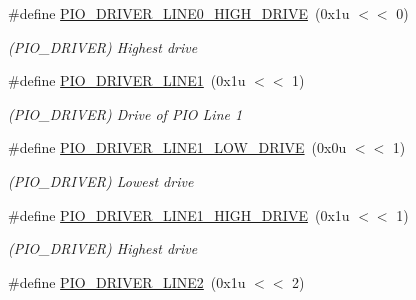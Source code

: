 \begin{DoxyCompactItemize}
\mbox{\label{group__SAME70__PIO_gae18af59abd02442e0dec363f8127e6e8}} 
\#define \mbox{\hyperlink{group__SAME70__PIO_gae18af59abd02442e0dec363f8127e6e8}{P\+I\+O\+\_\+\+D\+R\+I\+V\+E\+R\+\_\+\+L\+I\+N\+E0\+\_\+\+H\+I\+G\+H\+\_\+\+D\+R\+I\+VE}}~(0x1u $<$$<$ 0)
\begin{DoxyCompactList}\small\item\em (P\+I\+O\+\_\+\+D\+R\+I\+V\+ER) Highest drive \end{DoxyCompactList}\item 
\mbox{\label{group__SAME70__PIO_gaabc84f3913a22b25c01a2d984ee3b23e}} 
\#define \mbox{\hyperlink{group__SAME70__PIO_gaabc84f3913a22b25c01a2d984ee3b23e}{P\+I\+O\+\_\+\+D\+R\+I\+V\+E\+R\+\_\+\+L\+I\+N\+E1}}~(0x1u $<$$<$ 1)
\begin{DoxyCompactList}\small\item\em (P\+I\+O\+\_\+\+D\+R\+I\+V\+ER) Drive of P\+IO Line 1 \end{DoxyCompactList}\item 
\mbox{\label{group__SAME70__PIO_ga5d5d26e9e59145502a1f2ae79d423825}} 
\#define \mbox{\hyperlink{group__SAME70__PIO_ga5d5d26e9e59145502a1f2ae79d423825}{P\+I\+O\+\_\+\+D\+R\+I\+V\+E\+R\+\_\+\+L\+I\+N\+E1\+\_\+\+L\+O\+W\+\_\+\+D\+R\+I\+VE}}~(0x0u $<$$<$ 1)
\begin{DoxyCompactList}\small\item\em (P\+I\+O\+\_\+\+D\+R\+I\+V\+ER) Lowest drive \end{DoxyCompactList}\item 
\mbox{\label{group__SAME70__PIO_ga8ff344092884c5989a56833a084a816c}} 
\#define \mbox{\hyperlink{group__SAME70__PIO_ga8ff344092884c5989a56833a084a816c}{P\+I\+O\+\_\+\+D\+R\+I\+V\+E\+R\+\_\+\+L\+I\+N\+E1\+\_\+\+H\+I\+G\+H\+\_\+\+D\+R\+I\+VE}}~(0x1u $<$$<$ 1)
\begin{DoxyCompactList}\small\item\em (P\+I\+O\+\_\+\+D\+R\+I\+V\+ER) Highest drive \end{DoxyCompactList}\item 
\mbox{\label{group__SAME70__PIO_ga4ad0cee6d1444b97947e347f4e7a0440}} 
\#define \mbox{\hyperlink{group__SAME70__PIO_ga4ad0cee6d1444b97947e347f4e7a0440}{P\+I\+O\+\_\+\+D\+R\+I\+V\+E\+R\+\_\+\+L\+I\+N\+E2}}~(0x1u $<$$<$ 2)
$$
\end{DoxyCompactItemize}
